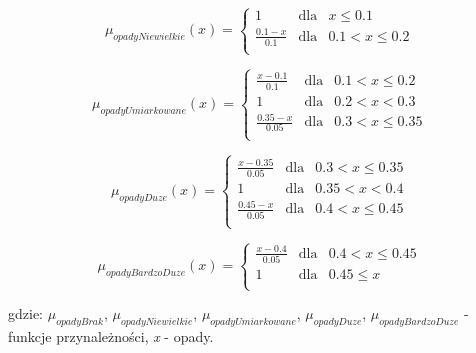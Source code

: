 \documentclass{classrep}
\begin{document}
\begin{equation}
\mu _{opadyNiewielkie}(x) = \left\{ \begin{array}{rcl}
1 & \mbox{dla} & x \leq 0.1 \\
\frac{0.1- x}{0.1} & \mbox{dla} & 0.1 < x \leq 0.2\\
\end{array}\right.
\end{equation}

\begin{equation}
\mu _{opadyUmiarkowane}(x) = \left\{ \begin{array}{rcl}
\frac{x - 0.1}{0.1} & \mbox{dla} & 0.1 < x \leq 0.2\\
1 & \mbox{dla} & 0.2 < x < 0.3\\
\frac{0.35 - x}{0.05} & \mbox{dla} & 0.3 < x \leq 0.35\\
\end{array}\right.
\end{equation}


\begin{equation}
\mu _{opadyDuze}(x) = \left\{ \begin{array}{rcl}
\frac{x - 0.35}{0.05} & \mbox{dla} & 0.3 < x \leq 0.35\\
1 & \mbox{dla} & 0.35 < x < 0.4\\
\frac{0.45 - x}{0.05} & \mbox{dla} & 0.4 < x \leq 0.45\\
\end{array}\right.
\end{equation}

\begin{equation}
\mu _{opadyBardzoDuze}(x) = \left\{ \begin{array}{rcl}
\frac{x - 0.4}{0.05} & \mbox{dla} & 0.4 < x \leq 0.45\\
1 & \mbox{dla} & 0.45 \leq x\\
\end{array}\right.
\end{equation}

gdzie: \(\mu _{opadyBrak}\), \(\mu _{opadyNiewielkie}\), \(\mu _{opadyUmiarkowane}\), \(\mu _{opadyDuze}\), \(\mu _{opadyBardzoDuze}\) - funkcje przynależności, \textit{x} - opady.
\end{document}

